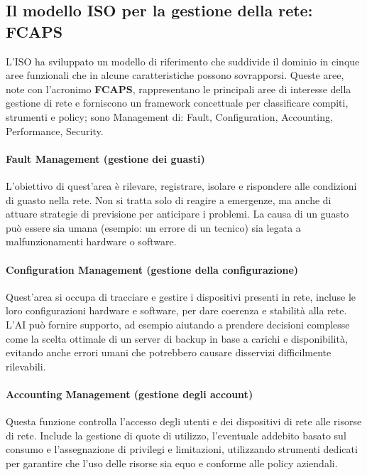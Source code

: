 \subsection{Il modello ISO per la gestione della rete: FCAPS}

L'ISO ha sviluppato un modello di riferimento che suddivide il dominio in cinque
aree funzionali che in alcune caratteristiche possono sovrapporsi. Queste aree, 
note con l'acronimo \textbf{FCAPS}, rappresentano
le principali aree di interesse della gestione di rete e forniscono un framework
concettuale per classificare compiti, strumenti e policy; sono Management di: 
Fault, Configuration, Accounting, Performance, Security.

\paragraph{Fault Management (gestione dei guasti)}

L'obiettivo di quest'area è rilevare, registrare, isolare e rispondere alle
condizioni di guasto nella rete.
Non si tratta solo di reagire a emergenze, ma anche di attuare strategie di
previsione per anticipare i problemi. La causa di un guasto può essere sia umana
(esempio: un errore di un tecnico) sia legata a malfunzionamenti hardware o
software.

\paragraph{Configuration Management (gestione della configurazione)}

Quest'area si occupa di tracciare e gestire i dispositivi presenti in rete,
incluse le loro configurazioni hardware e software, per dare coerenza e
stabilità alla rete. L'AI può fornire supporto, ad esempio aiutando a prendere decisioni complesse come la scelta
ottimale di un server di backup in base a carichi e disponibilità, evitando anche 
errori umani che potrebbero causare disservizi difficilmente rilevabili.

\paragraph{Accounting Management (gestione degli account)}

Questa funzione controlla l'accesso degli utenti e dei dispositivi di rete alle
risorse di rete. Include la gestione di quote di utilizzo, l'eventuale addebito
basato sul consumo e l'assegnazione di privilegi e limitazioni, utilizzando
strumenti dedicati per garantire che l'uso delle risorse sia equo e conforme
alle policy aziendali.

